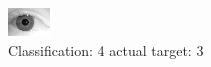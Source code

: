 \begin{figure}[h!]
\begin{center}
\includegraphics[width=0.60\columnwidth]{figures/ID2099_class_4_target_3.png}
\end{center}
\caption{ Classification: 4 actual target: 3}
\label{fig:ID2099_class_4_target_3}
\end{figure}
